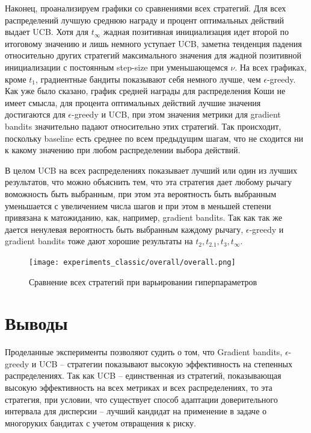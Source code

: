 Наконец, проанализируем графики со сравнениями всех стратегий. Для всех распределений лучшую среднюю награду и процент оптимальных действий выдает UCB. Хотя для $t_{\infty}$ жадная позитивная инициализация идет второй по итоговому значению и лишь немного уступает UCB, заметна тенденция падения относительно других стратегий максимального значения для жадной позитивной инициализации с постоянным step-size при уменьшающемся $\nu$. На всех графиках, кроме $t_1$, градиентные бандиты показывают себя немного лучше, чем $\epsilon$-greedy. Как уже было сказано, график средней награды для распределения Коши не имеет смысла, для процента оптимальных действий лучшие значения достигаются для $\epsilon$-greedy и UCB, при этом значения метрики для gradient bandits значительно падают относительно этих стратегий. Так происходит, поскольку baseline есть среднее по всем предыдущим шагам, что не сходится ни к какому значению при любом распределении выбора действий.

В целом UCB на всех распределениях показывает лучший или один из лучших результатов, что можно объяснить тем, что эта стратегия дает любому рычагу воможность быть выбранным, при этом эта вероятность быть выбранным уменьшается с увеличением числа шагов и при этом в меньшей степени привязана к матожиданию, как, например, gradient bandits. Так как так же дается ненулевая вероятность быть выбранным каждому рычагу, $\epsilon$-greedy и gradient bandits тоже дают хорошие результаты на $t_2, t_{2.1}, t_3, t_{\infty}$.

\begin{figure}[ht!]
    \centering
    \texttt{[image: experiments\_classic/overall/overall.png]}
    \caption{\label{fig:overall}Сравнение всех стратегий при варьировании гиперпараметров}
\end{figure}

\section{Выводы}

Проделанные эксперименты позволяют судить о том, что Gradient bandits, $\epsilon$-greedy и UCB -- стратегии показывают высокую эффективность на степенных распределениях. Так как UCB -- единственная из стратегий, показывающая высокую эффективность на всех метриках и всех распределениях, то эта стратегия, при условии, что существует способ адаптации доверительного интервала для дисперсии -- лучший кандидат на применение в задаче о многоруких бандитах с учетом отвращения к риску.
